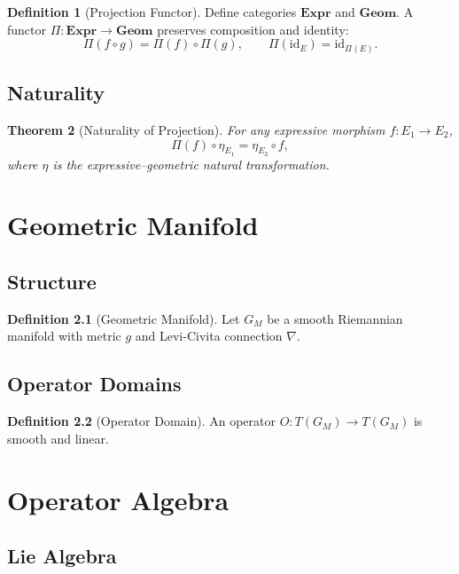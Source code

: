 \documentclass[11pt,oneside]{memoir}
\theoremstyle{definition}
\newtheorem{definition}{Definition}[chapter]
\theoremstyle{plain}
\newtheorem{theorem}[definition]{Theorem}
\theoremstyle{remark}
\begin{document}
\begin{definition}[Projection Functor]
Define categories $\mathbf{Expr}$ and $\mathbf{Geom}$. A functor 
$\Pi : \mathbf{Expr} \to \mathbf{Geom}$ preserves composition and identity:
\[
\Pi(f \circ g) = \Pi(f) \circ \Pi(g), \qquad \Pi(\mathrm{id}_E) = \mathrm{id}_{\Pi(E)}.
\]
\end{definition}

\section{Naturality}

\begin{theorem}[Naturality of Projection]
For any expressive morphism $f : E_1 \to E_2$,
\[
\Pi(f) \circ \eta_{E_1} = \eta_{E_2} \circ f,
\]
where $\eta$ is the expressive--geometric natural transformation.
\end{theorem}

\chapter{Geometric Manifold}

\section{Structure}

\begin{definition}[Geometric Manifold]
Let $G_M$ be a smooth Riemannian manifold with metric $g$ and Levi-Civita 
connection $\nabla$.
\end{definition}

\section{Operator Domains}

\begin{definition}[Operator Domain]
An operator $O : T(G_M) \to T(G_M)$ is smooth and linear.
\end{definition}

\chapter{Operator Algebra}

\section{Lie Algebra}
\end{document}

